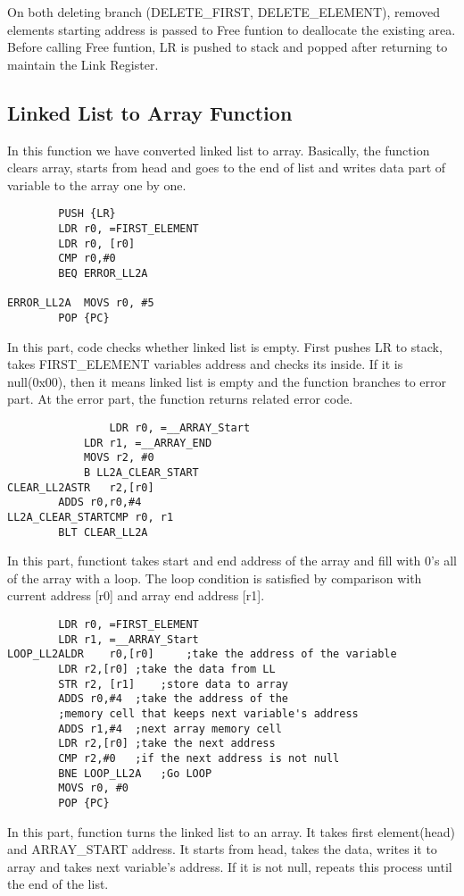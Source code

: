 \documentclass[pdftex,12pt,a4paper]{article}
\begin{document}
On both deleting branch (DELETE\_FIRST, DELETE\_ELEMENT), removed elements starting address is passed to Free funtion to deallocate the existing area. Before calling Free funtion, LR is pushed to stack and popped after returning to maintain the Link Register.

\subsection{Linked List to Array Function}
In this function we have converted linked list to array. Basically, the function clears array, starts from head and goes to the end of list and writes data part of variable to the array one by one.

\begin{lstlisting}
		PUSH {LR}
		LDR r0, =FIRST_ELEMENT
		LDR r0, [r0]
		CMP r0,#0
		BEQ ERROR_LL2A
		
ERROR_LL2A	MOVS r0, #5
		POP {PC}
\end{lstlisting}
In this part, code checks whether linked list is empty. First pushes LR to stack, takes FIRST\_ELEMENT variables address and checks its inside. If it is null(0x00), then it means linked list is empty and the function branches to error part. At the error part, the function returns related error code.

\begin{lstlisting}
                LDR r0, =__ARRAY_Start
	    	LDR r1, =__ARRAY_END 
	    	MOVS r2, #0			
	    	B LL2A_CLEAR_START	
CLEAR_LL2ASTR   r2,[r0]				
		ADDS r0,r0,#4			
LL2A_CLEAR_STARTCMP r0, r1				
		BLT CLEAR_LL2A			
\end{lstlisting}
In this part, functiont takes start and end address of the array and fill with 0's all of the array with a loop. The loop condition is satisfied by comparison with current address [r0] and array end address [r1].
\begin{lstlisting}
		LDR r0, =FIRST_ELEMENT
		LDR r1, =__ARRAY_Start 
LOOP_LL2ALDR    r0,[r0]     ;take the address of the variable
		LDR r2,[r0]	;take the data from LL
		STR r2, [r1]    ;store data to array
		ADDS r0,#4	;take the address of the 
		;memory cell that keeps next variable's address
		ADDS r1,#4	;next array memory cell
		LDR r2,[r0]	;take the next address
		CMP r2,#0	;if the next address is not null
		BNE LOOP_LL2A	;Go LOOP
		MOVS r0, #0
		POP {PC}
\end{lstlisting}
In this part, function turns the linked list to an array. It takes first element(head) and ARRAY\_START address. It starts from head, takes the data, writes it to array and takes next variable's address. If it is not null, repeats this process until the end of the list.
\end{document}
